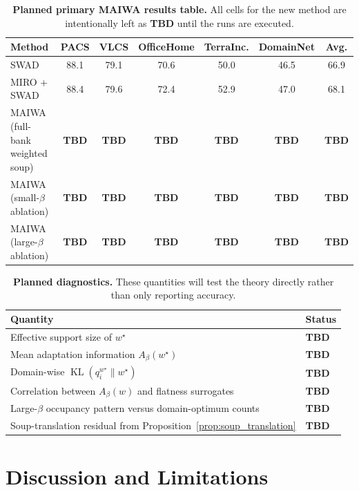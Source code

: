 \documentclass{article}
\newcommand{\KL}{\operatorname{KL}}
\newcommand{\TBD}{\textbf{TBD}}
\newcommand{\maiwa}{\textup{\textsc{MAIWA}}}
\newcommand{\swad}{\textup{\textsc{SWAD}}}
\newcommand{\miro}{\textup{\textsc{MIRO}}}
\begin{document}
\begin{table}[t]
    \centering
    \small
    \caption{\textbf{Planned primary \maiwa{} results table.} All cells for the new method are intentionally left as \TBD{} until the runs are executed.}
    \label{tab:main_tbd}
    \begin{tabular}{lcccccc}
        \toprule
        Method & PACS & VLCS & OfficeHome & TerraInc. & DomainNet & Avg. \\
        \midrule
        \swad{} & 88.1 & 79.1 & 70.6 & 50.0 & 46.5 & 66.9 \\
        \miro{} + \swad{} & 88.4 & 79.6 & 72.4 & 52.9 & 47.0 & 68.1 \\
        \maiwa{} (full-bank weighted soup) & \TBD{} & \TBD{} & \TBD{} & \TBD{} & \TBD{} & \TBD{} \\
        \maiwa{} (small-\(\beta\) ablation) & \TBD{} & \TBD{} & \TBD{} & \TBD{} & \TBD{} & \TBD{} \\
        \maiwa{} (large-\(\beta\) ablation) & \TBD{} & \TBD{} & \TBD{} & \TBD{} & \TBD{} & \TBD{} \\
        \bottomrule
    \end{tabular}
\end{table}

\begin{table}[t]
    \centering
    \small
    \caption{\textbf{Planned diagnostics.} These quantities will test the theory directly rather than only reporting accuracy.}
    \label{tab:diagnostics_tbd}
    \begin{tabular}{ll}
        \toprule
        Quantity & Status \\
        \midrule
        Effective support size of \(w^\star\) & \TBD{} \\
        Mean adaptation information \(A_\beta(w^\star)\) & \TBD{} \\
        Domain-wise \(\KL(q_i^{w^\star}\|w^\star)\) & \TBD{} \\
        Correlation between \(A_\beta(w)\) and flatness surrogates & \TBD{} \\
        Large-\(\beta\) occupancy pattern versus domain-optimum counts & \TBD{} \\
        Soup-translation residual from Proposition~\ref{prop:soup_translation} & \TBD{} \\
        \bottomrule
    \end{tabular}
\end{table}

\section{Discussion and Limitations}
\end{document}
